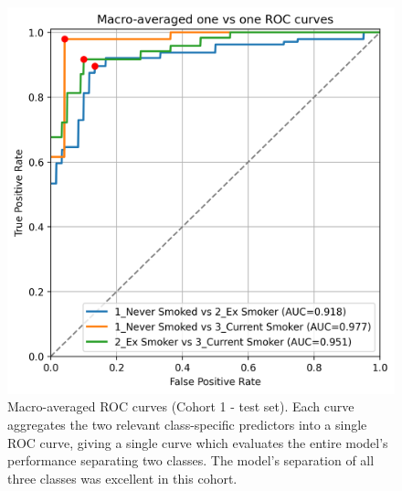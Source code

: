 \documentclass[draft]{article} %
\begin{document}
\begin{figure}[p]
    \centering
    \includegraphics[width=0.7\linewidth]{cohort1/test_macro_ovo_roc.png}
    \caption[Macro-averaged ROC curves (Cohort 1)]{Macro-averaged ROC curves (Cohort 1 - test set). Each curve aggregates the two relevant class-specific predictors into a single ROC curve, giving a single curve which evaluates the entire model's performance separating two classes. The model's separation of all three classes was excellent in this cohort.}
    \label{fig:cohort1-macro-rocs}
\end{figure}
\end{document}
